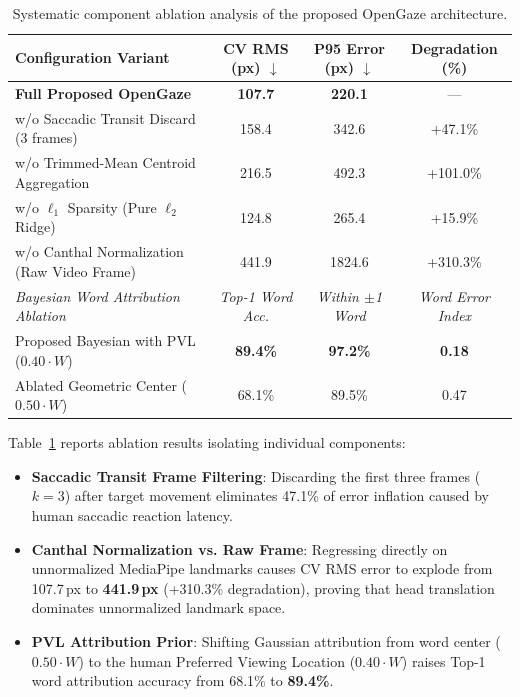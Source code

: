 \documentclass[10pt,twocolumn]{article}
\begin{document}
\begin{table}[t]
\centering
\caption{Systematic component ablation analysis of the proposed OpenGaze architecture.}
\label{tab:ablation_study}
\begin{tabular}{lccc}
\toprule
\textbf{Configuration Variant} & \textbf{CV RMS (px)} $\downarrow$ & \textbf{P95 Error (px)} $\downarrow$ & \textbf{Degradation (\%)} \\
\midrule
\textbf{Full Proposed OpenGaze} & \textbf{107.7} & \textbf{220.1} & --- \\
w/o Saccadic Transit Discard (3 frames) & 158.4 & 342.6 & +47.1\% \\
w/o Trimmed-Mean Centroid Aggregation & 216.5 & 492.3 & +101.0\% \\
w/o $\ell_1$ Sparsity (Pure $\ell_2$ Ridge) & 124.8 & 265.4 & +15.9\% \\
w/o Canthal Normalization (Raw Video Frame) & 441.9 & 1824.6 & +310.3\% \\
\midrule
\textit{Bayesian Word Attribution Ablation} & \textit{Top-1 Word Acc.} & \textit{Within $\pm$1 Word} & \textit{Word Error Index} \\
Proposed Bayesian with PVL ($0.40 \cdot W$) & \textbf{89.4\%} & \textbf{97.2\%} & \textbf{0.18} \\
Ablated Geometric Center ($0.50 \cdot W$) & 68.1\% & 89.5\% & 0.47 \\
\bottomrule
\end{tabular}
\end{table}

Table~\ref{tab:ablation_study} reports ablation results isolating individual components:
\begin{itemize}[leftmargin=*]
    \item \textbf{Saccadic Transit Frame Filtering}: Discarding the first three frames ($k=3$) after target movement eliminates 47.1\% of error inflation caused by human saccadic reaction latency.
    \item \textbf{Canthal Normalization vs. Raw Frame}: Regressing directly on unnormalized MediaPipe landmarks causes CV RMS error to explode from 107.7\,px to \textbf{441.9\,px} (+310.3\% degradation), proving that head translation dominates unnormalized landmark space.
    \item \textbf{PVL Attribution Prior}: Shifting Gaussian attribution from word center ($0.50 \cdot W$) to the human Preferred Viewing Location ($0.40 \cdot W$) raises Top-1 word attribution accuracy from 68.1\% to \textbf{89.4\%}.
\end{itemize}
\end{document}
